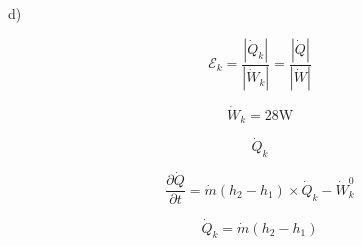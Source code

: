 d)

\[
\mathcal{E}_k = \frac{|\dot{Q}_k|}{|\dot{W}_k|} = \frac{|\dot{Q}|}{|\dot{W}|}
\]

\[
\dot{W}_k = 28 \text{W}
\]

\[
\dot{Q}_k
\]

\[
\frac{\partial \dot{Q}}{\partial t} = \dot{m}(h_2 - h_1) \times \dot{Q}_k - \dot{W}_k^0
\]

\[
\dot{Q}_k = \dot{m}(h_2 - h_1)
\]